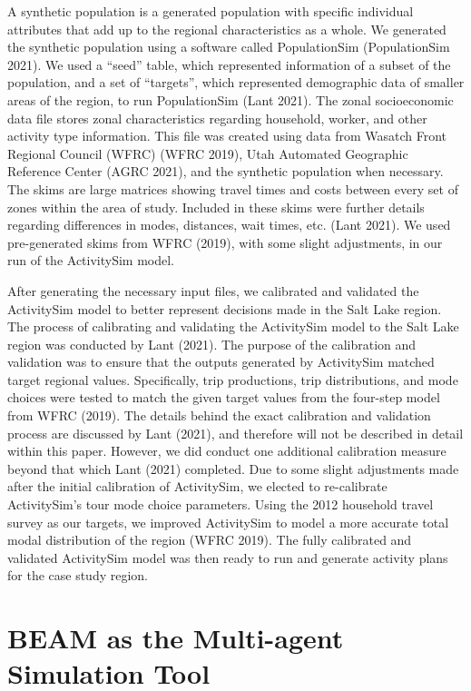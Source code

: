 \documentclass[12pt, oneside, openright]{byuthesis}
\begin{document}
A synthetic population is a generated population with specific individual attributes that add up to the regional characteristics as a whole. We generated the synthetic population using a software called PopulationSim (PopulationSim 2021). We used a ``seed'' table, which represented information of a subset of the population, and a set of ``targets'', which represented demographic data of smaller areas of the region, to run PopulationSim (Lant 2021). The zonal socioeconomic data file stores zonal characteristics regarding household, worker, and other activity type information. This file was created using data from Wasatch Front Regional Council (WFRC) (WFRC 2019), Utah Automated Geographic Reference Center (AGRC 2021), and the synthetic population when necessary. The skims are large matrices showing travel times and costs between every set of zones within the area of study. Included in these skims were further details regarding differences in modes, distances, wait times, etc. (Lant 2021). We used pre-generated skims from WFRC (2019), with some slight adjustments, in our run of the ActivitySim model.

After generating the necessary input files, we calibrated and validated the ActivitySim model to better represent decisions made in the Salt Lake region. The process of calibrating and validating the ActivitySim model to the Salt Lake region was conducted by Lant (2021). The purpose of the calibration and validation was to ensure that the outputs generated by ActivitySim matched target regional values. Specifically, trip productions, trip distributions, and mode choices were tested to match the given target values from the four-step model from WFRC (2019). The details behind the exact calibration and validation process are discussed by Lant (2021), and therefore will not be described in detail within this paper. However, we did conduct one additional calibration measure beyond that which Lant (2021) completed. Due to some slight adjustments made after the initial calibration of ActivitySim, we elected to re-calibrate ActivitySim's tour mode choice parameters. Using the 2012 household travel survey as our targets, we improved ActivitySim to model a more accurate total modal distribution of the region (WFRC 2019). The fully calibrated and validated ActivitySim model was then ready to run and generate activity plans for the case study region.

\hypertarget{meth-beam}{%
\section{BEAM as the Multi-agent Simulation Tool}\label{meth-beam}}
\end{document}

